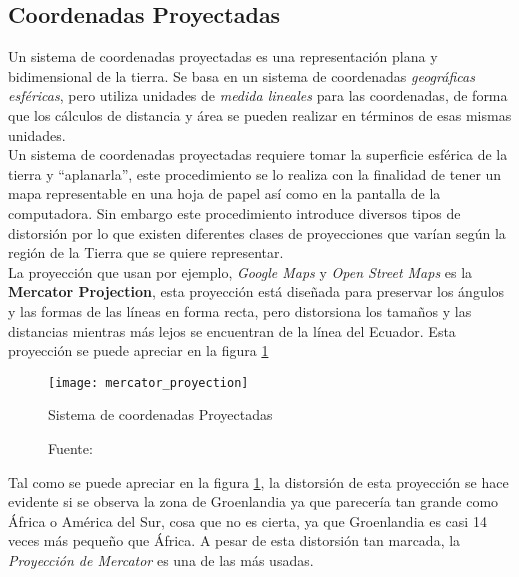       \subsection{Coordenadas Proyectadas} %
      \label{sub:coordenadas_proyectadas}
        Un sistema de coordenadas proyectadas es una representación plana y bidimensional de la  tierra. Se basa en un sistema de coordenadas \emph{geográficas esféricas}, pero utiliza unidades de \emph{medida lineales} para las coordenadas, de forma que los cálculos de distancia y área se pueden realizar en términos de esas mismas unidades.\cite{projected} \\

        Un sistema de coordenadas proyectadas requiere tomar la superficie esférica de la tierra y ``aplanarla'', este procedimiento se lo realiza con la finalidad de tener un mapa representable en una hoja de papel así como en la pantalla de la computadora. Sin embargo este procedimiento introduce diversos tipos de distorsión por lo que existen diferentes clases de proyecciones que varían según la región de la Tierra que se quiere representar.\\

        La proyección que usan por ejemplo, \emph{Google Maps} y \emph{Open Street Maps} es la \textbf{Mercator Projection}\cite{gmaps_osm}, esta proyección está diseñada para preservar los ángulos y las formas de las líneas en forma recta, pero distorsiona los tamaños y las distancias mientras más lejos se encuentran de la línea del Ecuador. Esta proyección se puede apreciar en la figura \ref{fig:mercator_proyection}


        \begin{figure}[H]
          \begin{center}
            \texttt{[image: mercator\_proyection]}
          \end{center}
          \caption{Sistema de coordenadas Proyectadas}
          \label{fig:mercator_proyection}
          \caption*{Fuente: \cite{coords2009} }
        \end{figure}

        Tal como se puede apreciar en la figura \ref{fig:mercator_proyection}, la distorsión de esta proyección se hace evidente si se observa la zona de Groenlandia ya que parecería tan grande como África o América del Sur, cosa que no es cierta, ya que Groenlandia es casi 14 veces más pequeño que África. A pesar de esta distorsión tan marcada, la \emph{Proyección de Mercator} es una de las más usadas.

